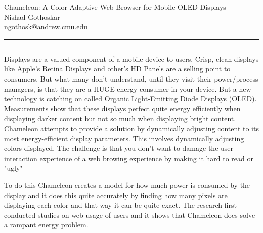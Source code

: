 \documentclass[11pt]{article}
\newcommand{\question}[2] {\vspace{.25in} \hrule\vspace{0.5em}
	\noindent{\bf #1: #2} \vspace{0.5em}
	\hrule \vspace{.10in}}
\newcommand{\myname}{Nishad Gothoskar}
\newcommand{\myandrew}{ngothosk}
\begin{document}
	
	\medskip                        %
	
	\thispagestyle{plain}
	\begin{center}                  %
		{\Large Chameleon: A Color-Adaptive Web Browser for Mobile OLED Displays} \\
		\myname \\
		\myandrew @andrew.cmu.edu\\
	\end{center}
	
	\question{1}{Summary}
	\quad Displays are a valued component of a mobile device to users. Crisp, clean displays like Apple's Retina Displays and other's HD Panels are a selling point to consumers. But what many don't understand, until they visit their power/process managers, is that they are a HUGE energy consumer in your device. But a new technology is catching on called Organic Light-Emitting Diode Displays (OLED). Measurements show that these displays perfect quite energy efficiently when displaying darker content but not so much when displaying bright content. Chameleon attempts to provide a solution by dynamically adjusting content to its most energy-efficient display parameters. This involves dynamically adjusting colors displayed. The challenge is that you don't want to damage the user interaction experience of a web browing experience by making it hard to read or "ugly"
	
	\quad To do this Chameleon creates a model for how much power is consumed by the display and it does this quite accurately by finding how many pixels are displaying each color and that way it can be quite exact. The research first conducted studies on web usage of users and it shows that Chameleon does solve a rampant energy problem.
	
\end{document}
